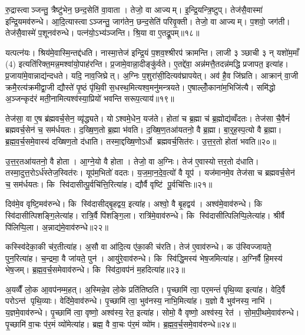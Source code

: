 रु॒द्रास्त्वाञ्जन्तु॒ त्रैष्टु॑भेन॒ छन्द॒सेति॑ वा॒वाता। तेजो॒ वा आज्यम्। इ॒न्द्रि॒यन्त्रि॒ष्टुप्। तेज॑सै॒वास्मा॑ इन्द्रि॒यमव॑रुन्धे। आ॒दि॒त्यास्त्वाऽञ्जन्तु॒ जाग॑तेन॒ छन्द॒सेति॑ परिवृ॒क्ती। तेजो॒ वा आज्यम्। प॒शवो॒ जग॑ती। तेज॑सै॒वास्मे॑ प॒शूनव॑रुन्धे। पत्न॑यो॒ऽभ्य॑ञ्जन्ति। श्रि॒या वा ए॒तद्रू॒पम्॥१८॥

यत्पत्न॑यः। श्रिय॑मे॒वास्मि॒न्तद्द॑धति। नास्मा॒त्तेज॑ इन्द्रि॒यं प॒शव॒श्श्रीरप॑ क्रामन्ति। लाजी ३ ञ्छाची ३ न् यशो॑म॒माँ (4) इत्यति॑रिक्त॒मन्न॒मश्वा॑यो॒पाह॑रन्ति। प्र॒जामे॒वान्ना॒दीङ्कु॑र्वते। ए॒तद्दे॑वा॒ अन्न॑मत्तै॒तदन्न॑मद्धि प्रजापत॒ इत्या॑ह। प्र॒जाया॑मे॒वान्नाद्य॑न्दधते। यदि॒ नाव॒जिघ्रेत्। अ॒ग्निः प॒शुरा॑सी॒दित्यव॑घ्रापयेत्। अव॑ है॒व जि॑घ्रति। आक्रान्॑ वा॒जी क्रमै॒रत्य॑क्रमीद्वा॒जी द्यौस्ते॑ पृ॒ष्ठं पृ॑थि॒वी स॒धस्थ॒मित्यश्व॒मनु॑मन्त्रयते। ए॒षाल्लोँ॒काना॑म॒भिजि॑त्यै। समि॑द्धो अ॒ञ्जन्कृद॑रं मती॒नामित्यश्व॑स्या॒प्रियो॑ भवन्ति सरूप॒त्याय॑॥१९॥\anuvakamend[परि॑त॒स्थुष॒ इत्या॑हे॒मे ए॒वास्मै॑ युनक्त्य॒भिजि॑त्यै भरन्त्यश्वमे॒धो रु॑न्धे रू॒पञ्जि॑घ्रति॒ त्रीणि॑ च]

तेज॑सा॒ वा ए॒ष ब्र॑ह्मवर्च॒सेन॒ व्यृ॑द्ध्यते। योऽश्वमे॒धेन॒ यज॑ते। होता॑ च ब्र॒ह्मा च॑ ब्र॒ह्मोद्य॑व्वँदतः। तेज॑सा चै॒वैनं॑ ब्रह्मवर्च॒सेन॑ च॒ सम॑र्धयतः। द॒ख्षि॒ण॒तो ब्र॒ह्मा भ॑वति। द॒ख्षि॒ण॒तआ॑यतनो॒ वै ब्र॒ह्मा। बा॒र्॒ह॒स्प॒त्यो वै ब्र॒ह्मा। ब्र॒ह्म॒व॒र्च॒समे॒वास्य॑ दख्षिण॒तो द॑धाति। तस्मा॒द्दख्षि॒णोऽर्धो ब्रह्मवर्च॒सित॑रः। उ॒त्त॒र॒तो होता॑ भवति॥२०॥

उ॒त्त॒र॒तआ॑यतनो॒ वै होता। आ॒ग्ने॒यो वै होता। तेजो॒ वा अ॒ग्निः। तेज॑ ए॒वास्योत्तर॒तो द॑धाति। तस्मा॒दुत्त॒रोऽर्ध॑स्तेज॒स्वित॑रः। यूप॑म॒भितो॑ वदतः। य॒ज॒मा॒न॒दे॒व॒त्यो॑ वै यूप॑। यज॑मानमे॒व तेज॑सा च ब्रह्मवर्च॒सेन॑ च॒ सम॑र्धयतः। कि स्वि॑दासीत्पू॒र्वचि॑त्ति॒रित्या॑ह। द्यौर्वै वृष्टि॑ पू॒र्वचि॑त्तिः॥२१॥

दिव॑मे॒व वृष्टि॒मव॑रुन्धे। कि स्वि॑दासीद्बृ॒हद्वय॒ इत्या॑ह। अश्वो॒ वै बृ॒हद्वय॑। अश्व॑मे॒वाव॑रुन्धे। कि स्वि॑दासीत्पिशङ्गि॒लेत्या॑ह। रात्रि॒र्वै पि॑शङ्गि॒ला। रात्रि॑मे॒वाव॑रुन्धे। कि स्वि॑दासीत्पिलिप्पि॒लेत्या॑ह। श्रीर्वै पि॑लिप्पि॒ला। अ॒न्नाद्य॑मे॒वाव॑रुन्धे॥२२॥

कस्स्वि॑देका॒की च॑र॒तीत्या॑ह। अ॒सौ वा आ॑दि॒त्य ए॑का॒की च॑रति। तेज॑ ए॒वाव॑रुन्धे। क उ॑स्विज्जायते॒ पुन॒रित्या॑ह। च॒न्द्रमा॒ वै जा॑यते॒ पुन॑। आयु॑रे॒वाव॑रुन्धे। कि स्वि॑द्धि॒मस्य॑ भेष॒जमित्या॑ह। अ॒ग्निर्वै हि॒मस्य॑ भेष॒जम्। ब्र॒ह्म॒व॒र्च॒समेवाव॑रुन्धे। कि स्वि॑दा॒वप॑नं म॒हदित्या॑ह॥२३॥

अ॒यव्वैँ लो॒क आ॒वप॑नम्म॒हत्। अ॒स्मिन्ने॒व लो॒के प्रति॑तिष्ठति। पृ॒च्छामि॑ त्वा॒ पर॒मन्तं॑ पृथि॒व्या इत्या॑ह। वेदि॒र्वै परोऽन्त॑ पृथि॒व्याः। वेदि॑मे॒वाव॑रुन्धे। पृ॒च्छामि॑ त्वा॒ भुव॑नस्य॒ नाभि॒मित्या॑ह। य॒ज्ञो वै भुव॑नस्य॒ नाभि॑। य॒ज्ञमे॒वाव॑रुन्धे। पृ॒च्छामि॑ त्वा॒ वृष्णो॒ अश्व॑स्य॒ रेत॒ इत्या॑ह। सोमो॒ वै वृष्णो॒ अश्व॑स्य॒ रेत॑। सो॒म॒पी॒थमे॒वाव॑रुन्धे। पृ॒च्छामि॑ वा॒चः प॑र॒मं व्यो॑मेत्या॑ह। ब्रह्म॒ वै वा॒चः प॑र॒मं व्यो॑म। ब्र॒ह्म॒व॒र्च॒समे॒वाव॑रुन्धे॥२४॥\anuvakamend[होता॑ भवति॒ वै वृष्टि॑ पू॒र्वचि॑त्तिर॒न्नाद्य॑मे॒वाव॑रुन्धे म॒हदित्या॑ह॒ सोमो॒ वै वृष्णो॒ अश्व॑स्य॒ रेत॑श्च॒त्वारि॑ च]

